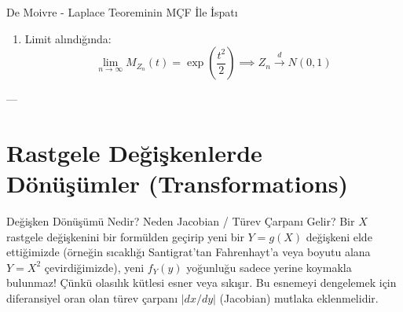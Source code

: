 \documentclass[12pt,a4paper]{article}
\begin{document}
\begin{odev}{De Moivre - Laplace Teoreminin MÇF İle İspatı}
\begin{enumerate}
    $u = \frac{t}{\sqrt{npq}}$ yerine yazılırsa:
    \begin{equation}
        \ln M_{Z_n}(t) = n \left[ \frac{pq}{2} \frac{t^2}{npq} + O(n^{-3/2}) \right] = \frac{t^2}{2} + O(n^{-1/2})
    \end{equation}
    \item Limit alındığında:
    \begin{equation}
        \lim_{n \to \infty} M_{Z_n}(t) = \exp\left( \frac{t^2}{2} \right) \implies \boxed{Z_n \xrightarrow{d} N(0, 1)}
    \end{equation}
\end{enumerate}
\end{odev}

\begin{center}
\end{center}

---

\section{Rastgele Değişkenlerde Dönüşümler (Transformations)}

\begin{sezgi}{Değişken Dönüşümü Nedir? Neden Jacobian / Türev Çarpanı Gelir?}
Bir $X$ rastgele değişkenini bir formülden geçirip yeni bir $Y = g(X)$ değişkeni elde ettiğimizde (örneğin sıcaklığı Santigrat'tan Fahrenhayt'a veya boyutu alana $Y = X^2$ çevirdiğimizde), yeni $f_Y(y)$ yoğunluğu sadece yerine koymakla bulunmaz!  
Çünkü olasılık kütlesi esner veya sıkışır. Bu esnemeyi dengelemek için diferansiyel oran olan türev çarpanı $|dx/dy|$ (Jacobian) mutlaka eklenmelidir.
\end{sezgi}
\end{document}
